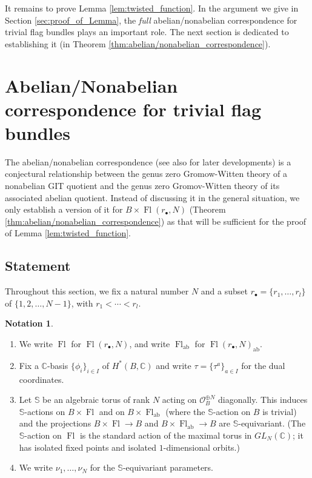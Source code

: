 \documentclass[a4paper,12pt]{amsart}
\numberwithin{equation}{section}
\theoremstyle{definition}
\newtheorem{notation}[theorem]{Notation}
\newcommand{\C}{\mathbb{C}}
\newcommand{\bbS}{\mathbb{S}}
\newcommand{\Fl}{\operatorname{Fl}}
\newcommand{\FlG}{\operatorname{Fl}}
\newcommand{\FlT}{\operatorname{Fl}_{\operatorname{ab}}}
\begin{document}
It remains to prove Lemma \ref{lem:twisted_function}. In the argument we give in Section \ref{sec:proof_of_Lemma}, the \emph{full} abelian/nonabelian correspondence for trivial flag bundles plays an important role. The next section is dedicated to establishing it (in Theorem \ref{thm:abelian/nonabelian_correspondence}).

\section{Abelian/Nonabelian correspondence for trivial flag bundles}\label{sec:ab/nonab}

The abelian/nonabelian correspondence \cite{BCFK:ab/nonab,CFKS} (see also \cite{Webb,CLS} for later developments) is a conjectural relationship between the genus zero Gromow-Witten theory of a nonabelian GIT quotient and the genus zero Gromov-Witten theory of its associated abelian quotient.
Instead of discussing it in the general situation, we only establish a version of it for $B\times\Fl(r_\bullet,N)$ (Theorem \ref{thm:abelian/nonabelian_correspondence}) as that will be sufficient for the proof of Lemma \ref{lem:twisted_function}.

\subsection{Statement}\label{subsec:statement_of_ab/nonab}
Throughout this section, we fix a natural number $N$ and a subset $r_\bullet=\{r_1,\dots,r_l\}$ of $\{1,2,\dots,N-1\}$, with $r_1<\cdots<r_l$.

\begin{notation}\label{notation:S-action}
    \phantom{A}
    \begin{enumerate}
        \item 
        We write $\FlG$ for $\Fl(r_\bullet,N)$, and write $\FlT$ for $\Fl(r_\bullet,N)_{\operatorname{ab}}$.
        \item 
        Fix a $\C$-basis $\{\phi_i\}_{i\in I}$ of $H^*(B,\C)$ and write $\tau=\{\tau^a\}_{a\in I}$ for the dual coordinates.
        \item 
        Let $\bbS$ be an algebraic torus of rank $N$ acting on $\mathcal{O}_B^{\oplus N}$ diagonally.
        This induces $\bbS$-actions on $B\times\FlG$ and on $B\times\FlT$ (where the $\bbS$-action on $B$ is trivial) and the projections $B\times\FlG\to B$ and $B\times\FlT\to B$ are $\bbS$-equivariant. (The $\bbS$-action on $\FlG$ is the standard action of the maximal torus in $GL_N(\C)$; it has isolated fixed points and isolated $1$-dimensional orbits.)
        \item 
        We write $\nu_1,\dots,\nu_N$ for the $\bbS$-equivariant parameters.
    \end{enumerate}
\end{notation}
\end{document}
